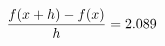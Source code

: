 \documentclass[preview]{standalone}
\begin{document}
\begin{align*}
\special{dvisvgm:raw <g id='unique000'>}\frac{f(x+h)-f(x)}{h} = 2.089\special{dvisvgm:raw </g>}
\end{align*}
\end{document}

